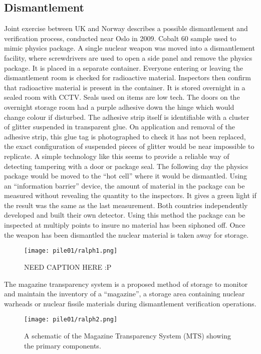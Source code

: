 \documentclass[twoside,titlepage,11pt,twocolumn,a4paper]{article}
\begin{document}
\subsection{Dismantlement}
Joint exercise between UK and Norway describes a possible
dismantlement and verification process, conducted near Oslo in
2009. Cobalt 60 sample used to mimic physics package. A single nuclear
weapon was moved into a dismantlement facility, where screwdrivers are
used to open a side panel and remove the physics package. It is placed
in a separate container. Everyone entering or leaving the
dismantlement room is checked for radioactive material. Inspectors
then confirm that radioactive material is present in the container. It
is stored overnight in a sealed room with CCTV. Seals used on items
are low tech. The doors on the overnight storage room had a purple
adhesive down the hinge which would change colour if disturbed. The
adhesive strip itself is identifiable with a cluster of glitter
suspended in transparent glue. On application and removal of the
adhesive strip, this glue tag is photographed to check it has not been
replaced, the exact configuration of suspended pieces of glitter would
be near impossible to replicate. A simple technology like this seems
to provide a reliable way of detecting tampering with a door or
package seal. The following day the physics package would be moved to
the ``hot cell'' where it would be dismantled.  Using an ``information
barrier'' device, the amount of material in the package can be
measured without revealing the quantity to the inspectors. It gives a
green light if the result was the same as the last measurement. Both
countries independently developed and built their own detector. Using
this method the package can be inspected at multiply points to insure
no material has been siphoned off. Once the weapon has been dismantled
the nuclear material is taken away for storage.\citep{dismantleBBC2009}

\begin{figure}
  \texttt{[image: pile01/ralph1.png]}
	\caption{NEED CAPTION HERE :P \citep{dismantleBBC2009}}
\end{figure}

The magazine transparency system is a proposed method of storage to
monitor and maintain the inventory of a ``magazine'', a storage area
containing nuclear warheads or nuclear fissile materials during
dismantlement verification operations.

\begin{figure}
  \texttt{[image: pile01/ralph2.png]}
  \caption{A schematic of the Magazine Transparency System (MTS) 
    showing the primary components. \citep{gerdes2001}}
\end{figure}
\end{document}
